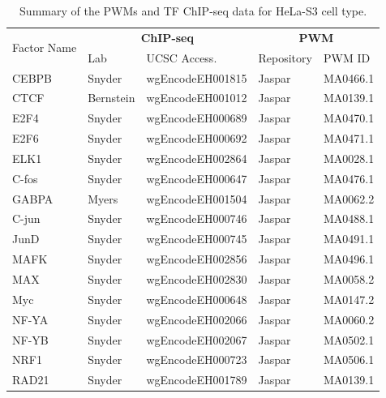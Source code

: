 \documentclass{bioinfo}
\begin{document}
\begin{table}[t]
\begin{center}
\caption{Summary of the PWMs and TF ChIP-seq data for HeLa-S3 cell type.}
\label{tab:datapwm.helas3}
    \renewcommand{\arraystretch}{1.2}
    \begin{tabular}{ l|ll|ll }
        \hline
        \multirow{2}{*}{Factor Name} & \multicolumn{2}{c|}{\textbf{ChIP-seq}} & \multicolumn{2}{c}{\textbf{PWM}} \\
               & Lab       & UCSC Access.     & Repository & PWM ID \\
        \hline
        CEBPB  & Snyder    & wgEncodeEH001815 & Jaspar     & MA0466.1 \\
        CTCF   & Bernstein & wgEncodeEH001012 & Jaspar     & MA0139.1 \\
        E2F4   & Snyder    & wgEncodeEH000689 & Jaspar     & MA0470.1 \\
        E2F6   & Snyder    & wgEncodeEH000692 & Jaspar     & MA0471.1 \\
        ELK1   & Snyder    & wgEncodeEH002864 & Jaspar     & MA0028.1 \\
        C-fos    & Snyder    & wgEncodeEH000647 & Jaspar     & MA0476.1 \\
        GABPA   & Myers     & wgEncodeEH001504 & Jaspar     & MA0062.2 \\
        C-jun    & Snyder    & wgEncodeEH000746 & Jaspar     & MA0488.1 \\
        JunD   & Snyder    & wgEncodeEH000745 & Jaspar     & MA0491.1 \\
        MAFK   & Snyder    & wgEncodeEH002856 & Jaspar     & MA0496.1 \\
        MAX    & Snyder    & wgEncodeEH002830 & Jaspar     & MA0058.2 \\
        Myc    & Snyder    & wgEncodeEH000648 & Jaspar     & MA0147.2 \\
        NF-YA   & Snyder    & wgEncodeEH002066 & Jaspar     & MA0060.2 \\
        NF-YB   & Snyder    & wgEncodeEH002067 & Jaspar     & MA0502.1 \\
        NRF1   & Snyder    & wgEncodeEH000723 & Jaspar     & MA0506.1 \\
        RAD21  & Snyder    & wgEncodeEH001789 & Jaspar     & MA0139.1 \\

\end{tabular}
\end{center}
\end{table}
\end{document}
